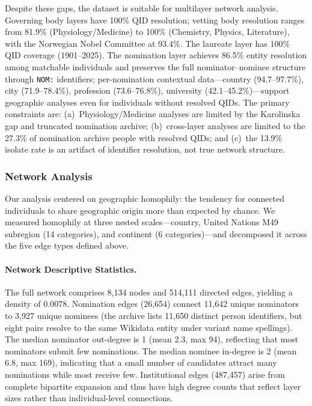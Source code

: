 \documentclass[12pt]{article}
\begin{document}
Despite these gaps, the dataset is suitable for multilayer network analysis. Governing body layers have 100\% QID resolution; vetting body resolution ranges from 81.9\% (Physiology/Medicine) to 100\% (Chemistry, Physics, Literature), with the Norwegian Nobel Committee at 93.4\%. The laureate layer has 100\% QID coverage (1901--2025). The nomination layer achieves 86.5\% entity resolution among matchable individuals and preserves the full nominator--nominee structure through \texttt{NOM:} identifiers; per-nomination contextual data---country (94.7--97.7\%), city (71.9--78.4\%), profession (73.6--76.8\%), university (42.1--45.2\%)---support geographic analyses even for individuals without resolved QIDs. The primary constraints are: (a)~Physiology/Medicine analyses are limited by the Karolinska gap and truncated nomination archive; (b)~cross-layer analyses are limited to the 27.3\% of nomination archive people with resolved QIDs; and (c)~the 13.9\% isolate rate is an artifact of identifier resolution, not true network structure.

\subsubsection*{Network Analysis}

Our analysis centered on geographic homophily: the tendency for connected individuals to share geographic origin more than expected by chance. We measured homophily at three nested scales---country, United Nations M49 subregion (14 categories), and continent (6 categories)---and decomposed it across the five edge types defined above.

\paragraph*{Network Descriptive Statistics.}

The full network comprises 8,134 nodes and 514,111 directed edges, yielding a density of 0.0078. Nomination edges (26,654) connect 11,642 unique nominators to 3,927 unique nominees (the archive lists 11,650 distinct person identifiers, but eight pairs resolve to the same Wikidata entity under variant name spellings). The median nominator out-degree is 1 (mean 2.3, max 94), reflecting that most nominators submit few nominations. The median nominee in-degree is 2 (mean 6.8, max 169), indicating that a small number of candidates attract many nominations while most receive few. Institutional edges (487,457) arise from complete bipartite expansion and thus have high degree counts that reflect layer sizes rather than individual-level connections.
\end{document}
